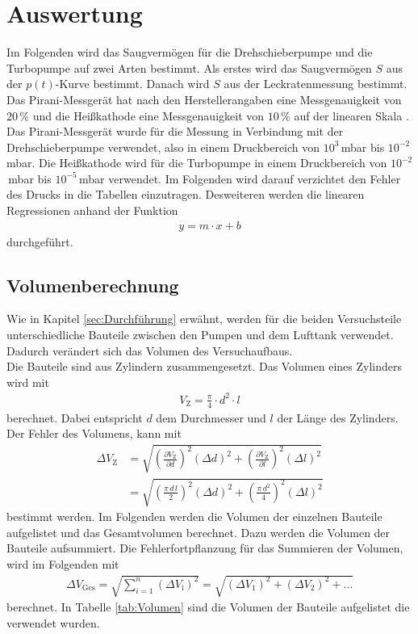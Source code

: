 \section{Auswertung}
\label{sec:Auswertung}
Im Folgenden wird das Saugvermögen für die Drehschieberpumpe und die Turbopumpe auf zwei Arten bestimmt. Als erstes wird das Saugvermögen $S$ aus der $p(t)$-Kurve bestimmt. Danach wird $S$ aus der Leckratenmessung bestimmt. \\
Das Pirani-Messgerät hat nach den Herstellerangaben eine Messgenauigkeit von $20\,\%$ und die Heißkathode eine Messgenauigkeit von $10\,\%$ auf der linearen Skala \cite{V70}. Das Pirani-Messgerät wurde für die Messung in Verbindung mit der Drehschieberpumpe verwendet, also in einem Druckbereich von $10^{3}$\,mbar bis $10^{-2}$\,mbar. Die Heißkathode wird für die Turbopumpe in einem Druckbereich von $10^{-2}$\,mbar bis $10^{-5}$\,mbar verwendet. Im Folgenden wird darauf verzichtet den Fehler des Drucks in die Tabellen einzutragen. Desweiteren werden die linearen Regressionen anhand der Funktion
\begin{align}
  y = m\cdot x + b
\end{align}
durchgeführt.



\subsection{Volumenberechnung}
Wie in Kapitel \eqref{sec:Durchführung} erwähnt, werden für die beiden Versuchsteile unterschiedliche Bauteile zwischen den Pumpen und dem Lufttank verwendet. Dadurch verändert sich das Volumen des Versuchaufbaus. \\
Die Bauteile sind aus Zylindern zusammengesetzt. Das Volumen eines Zylinders wird mit
\begin{align} \label{eqn:VZ}
  V_\text{Z} = \frac{\pi}{4} \cdot d^2 \cdot l
\end{align}
berechnet. Dabei entspricht $d$ dem Durchmesser und $l$ der Länge des Zylinders. Der Fehler des Volumens, kann mit
\begin{align} \label{eqn:DVZ}
  \Delta V_\text{Z} &= \sqrt{ \left(\frac{\partial V_\text{Z}}{\partial d}\right)^2 (\Delta d)^2 + \left(\frac{\partial V_\text{Z}}{\partial l}\right)^2 (\Delta l)^2 } \nonumber \\
  &= \sqrt{ \left(\frac{\pi\,d\,l}{2}\right)^2 (\Delta d)^2 + \left(\frac{\pi\,d^2}{4}\right)^2 (\Delta l)^2 }
\end{align}
bestimmt werden. Im Folgenden werden die Volumen der einzelnen Bauteile aufgelistet und das Gesamtvolumen berechnet. Dazu werden die Volumen der Bauteile aufsummiert. Die Fehlerfortpflanzung für das Summieren der Volumen, wird im Folgenden mit
\begin{align}
  \Delta V_\text{Ges} = \sqrt{ \sum\limits_{i=1}^{n} (\Delta V_\text{i})^2 } = \sqrt{ (\Delta V_1)^2 + (\Delta V_2)^2 + \dots }
\end{align}
berechnet. In Tabelle \eqref{tab:Volumen} sind die Volumen der Bauteile aufgelistet die verwendet wurden.

